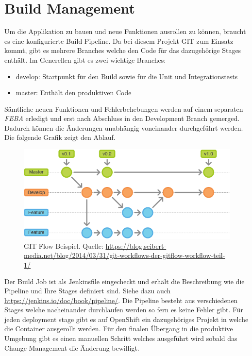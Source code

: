 \section{Build Management}
\label{build}


Um die Applikation zu bauen und neue Funktionen ausrollen zu können, braucht es eine konfigurierte Build Pipeline. Da bei diesem Projekt GIT zum Einsatz kommt, gibt es mehrere Branches welche den Code für das dazugehörige Stages enthält. Im Generellen gibt es zwei wichtige Branches:
\begin{itemize}
	\item develop: Startpunkt für den Build sowie für die Unit und Integrationstests
	\item master: Enthält den produktiven Code
\end{itemize}
Sämtliche neuen Funktionen und Fehlerbehebungen werden auf einem separaten \textit{\gls{FEBA}} erledigt und erst nach Abschluss in den Development Branch gemerged. Dadurch können die Änderungen unabhängig voneinander durchgeführt werden. Die folgende Grafik zeigt den Ablauf.
\begin{figure}[H]
	\centering
	\includegraphics[scale=0.6]{gitflow}
	\caption{GIT Flow Beispiel. Quelle: \url{https://blog.seibert-media.net/blog/2014/03/31/git-workflows-der-gitflow-workflow-teil-1/}}	
\end{figure}
Der Build Job ist als Jenkinsfile eingecheckt und erhält die Beschreibung wie die Pipeline und Ihre Stages definiert sind. Siehe dazu auch \url{https://jenkins.io/doc/book/pipeline/}. Die Pipeline besteht aus verschiedenen Stages welche nacheinander durchlaufen werden so fern es keine Fehler gibt. Für jeden deployment stage gibt es auf OpenShift ein dazugehöriges Projekt in welche die Container ausgerollt werden. Für den finalen Übergang in die produktive Umgebung gibt es einen manuellen Schritt welches ausgeführt wird sobald das Change Management die Änderung bewilligt.


